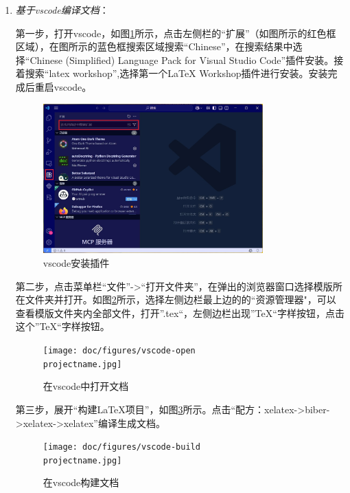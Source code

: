 \begin{enumerate}
    \item \emph{基于vscode编译文档}：
    
 		第一步，打开vscode，如图\ref{fig:vscode-ext}所示，点击左侧栏的“扩展”（如图所示的红色框区域），在图所示的蓝色框搜索区域搜索“Chinese”，在搜索结果中选择“Chinese (Simplified) Language Pack for Visual Studio Code”插件安装。接着搜索“latex workshop”,选择第一个LaTeX Workshop插件进行安装。安装完成后重启vscode。
 		\begin{figure}[!hptb]
            \centering
            \includegraphics[width=0.8\textwidth]{doc/figures/vscode-ext.jpg}
            \caption{vscode安装插件}
            \label{fig:vscode-ext}
        \end{figure}

 		第二步，点击菜单栏“文件”->“打开文件夹”，在弹出的浏览器窗口选择模版所在文件夹并打开。如图\ref{fig:vscode-openfile}所示，选择左侧边栏最上边的的“资源管理器"，可以查看模版文件夹内全部文件，打开”\projectname.tex“，左侧边栏出现”\TeX“字样按钮，点击这个”\TeX“字样按钮。
        \begin{figure}[!hptb]
            \centering
            \texttt{[image: doc/figures/vscode-open\\projectname.jpg]}
            \caption{在vscode中打开文档}
            \label{fig:vscode-openfile}
        \end{figure}

        第三步，展开“构建LaTeX项目”，如图\ref{fig:vscode-buildfile}所示。点击“配方：xelatex->biber->xelatex->xelatex”编译生成文档。
        \begin{figure}[!hptb]
            \centering
            \texttt{[image: doc/figures/vscode-build\\projectname.jpg]}
            \caption{在vscode构建文档}
            \label{fig:vscode-buildfile}
        \end{figure}


\end{enumerate}
